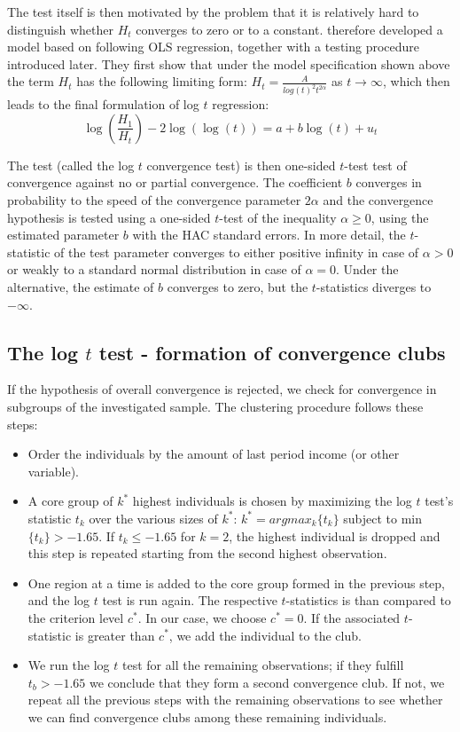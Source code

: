\documentclass[11pt]{article}
\begin{document}
The test itself is then motivated by the problem that it is relatively hard to distinguish whether $H_t$ converges to zero or to a constant. \citet{phillips2007transition} therefore developed a model based on following OLS regression, together with a testing procedure introduced later. They first show that under the model specification shown above the term $H_{t}$ has the following limiting form: \(H_{t} = \frac{A}{log (t)^2t^{2\alpha}}\) as \(t \rightarrow \infty\), which then leads to the final formulation of log $t$ regression:
\begin{equation}\label{eq10}\log\left(\frac{H_1}{H_t}\right)-2\log(\log(t)) = a + b\log(t) + u_t\end{equation}

The test (called the log $t$ convergence test) is then one-sided $t$-test test of convergence against no or partial convergence. The coefficient $b$ converges in probability to the speed of the convergence parameter $2\alpha$ and the convergence hypothesis is tested using a one-sided $t$-test of the inequality \(\alpha \geq 0 \), using the estimated parameter $b$ with the HAC standard errors. In more detail, the $t$-statistic of the test parameter converges to either positive infinity in case of \(\alpha > 0 \) or weakly to a standard normal distribution in case of \(\alpha = 0\). Under the alternative, the estimate of $b$ converges to zero, but the $t$-statistics diverges to $-\infty$.

\subsection{The log $t$ test - formation of convergence clubs }
If the hypothesis of overall convergence is rejected, we check for convergence in subgroups of the investigated sample. The clustering procedure follows these steps:
\begin{itemize}
    \item Order the individuals by the amount of last period income (or other variable).
    \item  A core group of $k^{*}$ highest individuals is chosen by maximizing the log $t$ test's statistic $t_{k}$ over the various sizes of $k^{*}$:
    \(k^{*} = arg max_{k}\{t_{k}\}\) subject to min \( \{t_{k}\}> -1.65\). If \(t_{k} \leq -1.65 \) for \(k=2\), the highest individual is dropped and this step is repeated starting from the second highest observation. 
    \item One region at a time is added to the core group formed in the previous step, and the log $t$ test is run again. The respective  $t$-statistics is than compared to the criterion level $c^{*}$. In our case, we choose $c^{*}=0$. If the associated $t$-statistic is greater than  $c^{*}$, we add the individual to the club.
    \item We run the log $t$ test for all the remaining observations; if they fulfill \(t_b > -1.65\) we conclude that they form a second convergence club. If not, we repeat all the previous steps with the remaining observations to see whether we can find convergence clubs among these remaining individuals.
\end{itemize}    
\end{document}
